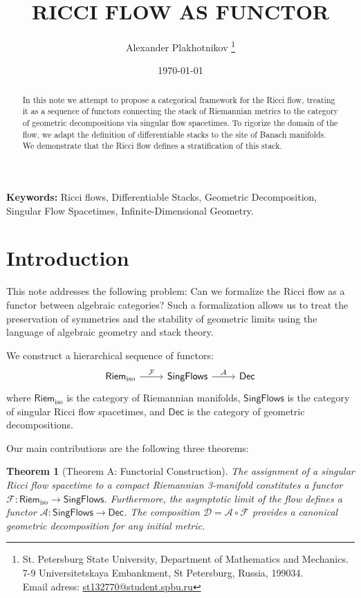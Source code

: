 \documentclass[11pt]{article}
\title{\textbf{RICCI FLOW AS FUNCTOR}}
\author{Alexander Plakhotnikov \footnote{St. Petersburg State University, Department of Mathematics and Mechanics. 7-9 Universitetskaya Embankment, St Petersburg, Russia, 199034.\\
Email adress: \url{st132770@student.spbu.ru}}}
\date{\today}
\newtheorem{theorem}{Theorem}[section]
\newcommand{\RiemIso}{\mathsf{Riem}_{\mathrm{iso}}}
\newcommand{\SingFlows}{\mathsf{SingFlows}}
\newcommand{\Dec}{\mathsf{Dec}}
\begin{document}
\maketitle
\begin{abstract}
    In this note we attempt to propose a categorical framework for the Ricci flow, treating it as a sequence of functors connecting the stack of Riemannian metrics to the category of geometric decompositions via singular flow spacetimes. To rigorize the domain of the flow, we adapt the definition of differentiable stacks to the site of Banach manifolds. We demonstrate that the Ricci flow defines a stratification of this stack.
\end{abstract}
\small{\tableofcontents}

\medskip


\textbf{Keywords:} Ricci flows, Differentiable Stacks, Geometric Decomposition, Singular Flow Spacetimes, Infinite-Dimensional Geometry.
\section{Introduction}
This note addresses the following problem: Can we formalize the Ricci flow as a functor between algebraic categories? Such a formalization allows us to treat the preservation of symmetries and the stability of geometric limits using the language of algebraic geometry and stack theory.

We construct a hierarchical sequence of functors:
\begin{equation} \label{eq:hierarchy}
\begin{tikzcd}
    \RiemIso \arrow[r, "\mathcal{F}"] &
    \SingFlows \arrow[r, "\mathcal{A}"] & \Dec
\end{tikzcd}
\end{equation}
where $\RiemIso$ is the category of Riemannian manifolds, $\SingFlows$ is the category of singular Ricci flow spacetimes, and $\Dec$ is the category of geometric decompositions.

Our main contributions are the following three theorems:

\begin{theorem}[Theorem A: Functorial Construction]
The assignment of a singular Ricci flow spacetime to a compact Riemannian 3-manifold constitutes a functor $\mathcal{F}: \RiemIso \longrightarrow\SingFlows$. Furthermore, the asymptotic limit of the flow defines a functor $\mathcal{A}: \SingFlows \longrightarrow\Dec$. The composition $\mathcal{D} = \mathcal{A} \circ \mathcal{F}$ provides a canonical geometric decomposition for any initial metric.
\end{theorem}
\end{document}
